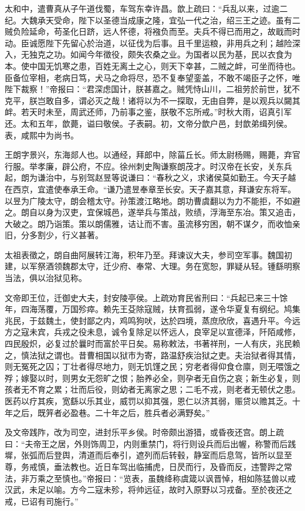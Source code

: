 \documentclass[12pt,UTF8]{ctexbook}
\begin{document}
太和中，遣曹真从子午道伐蜀，车驾东幸许昌。歆上疏曰：“兵乱以来，过逾二纪。大魏承天受命，陛下以圣德当成康之隆，宜弘一代之治，绍三王之迹。虽有二贼负险延命，苟圣化日跻，远人怀德，将襁负而至。夫兵不得已而用之，故戢而时动。臣诚愿陛下先留心於治道，以征伐为后事。且千里运粮，非用兵之利；越险深入，无独克之功。如闻今年徵役，颇失农桑之业。为国者以民为基，民以衣食为本。使中国无饥寒之患，百姓无离土之心，则天下幸甚，二贼之衅，可坐而待也。臣备位宰相，老病日笃，犬马之命将尽，恐不复奉望銮盖，不敢不竭臣子之怀，唯陛下裁察！”帝报曰：“君深虑国计，朕甚嘉之。贼凭恃山川，二祖劳於前世，犹不克平，朕岂敢自多，谓必灭之哉！诸将以为不一探取，无由自弊，是以观兵以闚其衅。若天时未至，周武还师，乃前事之鉴，朕敬不忘所戒。”时秋大雨，诏真引军还。太和五年，歆薨，谥曰敬侯。子表嗣。初，文帝分歆户邑，封歆弟缉列侯。表，咸熙中为尚书。

王朗字景兴，东海郯人也。以通经，拜郎中，除菑丘长。师太尉杨赐，赐薨，弃官行服。举孝廉，辟公府，不应。徐州刺史陶谦察朗茂才。时汉帝在长安，关东兵起，朗为谦治中，与别驾赵昱等说谦曰：“春秋之义，求诸侯莫如勤王。今天子越在西京，宜遣使奉承王命。“谦乃遣昱奉章至长安。天子嘉其意，拜谦安东将军。以昱为广陵太守，朗会稽太守。孙策渡江略地。朗功曹虞翻以为力不能拒，不如避之。朗自以身为汉吏，宜保城邑，遂举兵与策战，败绩，浮海至东冶。策又追击，大破之。朗乃诣策。策以朗儒雅，诘让而不害。虽流移穷困，朝不谋夕，而收恤亲旧，分多割少，行义甚著。

太祖表徵之，朗自曲阿展转江海，积年乃至。拜谏议大夫，参司空军事。魏国初建，以军祭酒领魏郡太守，迁少府、奉常、大理。务在宽恕，罪疑从轻。锺繇明察当法，俱以治狱见称。

文帝即王位，迁御史大夫，封安陵亭侯。上疏劝育民省刑曰：“兵起已来三十馀年，四海荡覆，万国殄瘁。赖先王芟除寇贼，扶育孤弱，遂令华夏复有纲纪。鸠集兆民，于兹魏土，使封鄙之内，鸡鸣狗吠，达於四境，蒸庶欣欣，喜遇升平。今远方之寇未宾，兵戎之役未息，诚令复除足以怀远人，良宰足以宣德泽，阡陌咸修，四民殷炽，必复过於曩时而富於平日矣。易称敕法，书著祥刑，一人有庆，兆民赖之，慎法狱之谓也。昔曹相国以狱市为寄，路温舒疾治狱之吏。夫治狱者得其情，则无冤死之囚；丁壮者得尽地力，则无饥馑之民；穷老者得仰食仓廪，则无喂饿之殍；嫁娶以时，则男女无怨旷之恨；胎养必全，则孕者无自伤之哀；新生必复，则孩者无不育之累；壮而后役，则幼者无离家之思；二毛不戎，则老者无顿伏之患。医药以疗其疾，宽繇以乐其业，威罚以抑其强，恩仁以济其弱，赈贷以赡其乏。十年之后，既笄者必盈巷。二十年之后，胜兵者必满野矣。”

及文帝践阼，改为司空，进封乐平乡侯。时帝颇出游猎，或昏夜还宫。朗上疏曰：“夫帝王之居，外则饰周卫，内则重禁门，将行则设兵而后出幄，称警而后践墀，张弧而后登舆，清道而后奉引，遮列而后转毂，静室而后息驾，皆所以显至尊，务戒慎，垂法教也。近日车驾出临捕虎，日昃而行，及昏而反，违警跸之常法，非万乘之至慎也。”帝报曰：“览表，虽魏绛称虞箴以讽晋悼，相如陈猛兽以戒汉武，未足以喻。方今二寇未殄，将帅远征，故时入原野以习戎备。至於夜还之戒，已诏有司施行。”
\end{document}
